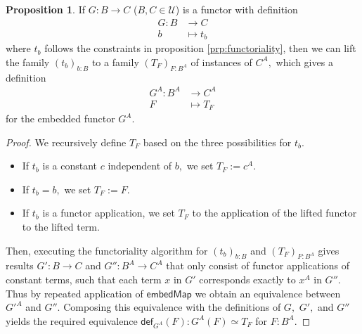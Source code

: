 \documentclass[a4paper]{article}
\theoremstyle{definition}
\newtheorem{proposition}[definition]{Proposition}
\theoremstyle{remark}
\renewcommand{\equiv}{\simeq}
\newcommand{\U}{\mathcal{U}}
\newcommand{\nm}{\mathsf}
\newcommand{\fndef}[1]{\nm{def}_{#1}}
\begin{document}
\begin{proposition}
  \label{prp:fun-univ-lift-fun}
  If $G : B \to C$ ($B,C \in \U$) is a functor with definition
  \begin{align*}
    G : B &\to     C\\
        b &\mapsto t_b
  \end{align*}
  where $t_b$ follows the constraints in proposition \ref{prp:functoriality},
  then we can lift the family $(t_b)_{b : B}$ to a family $(T_F)_{F : B^A}$ of
  instances of $C^A,$ which gives a definition
  \begin{align*}
    G^A : B^A &\to     C^A\\
          F   &\mapsto T_F
  \end{align*}
  for the embedded functor $G^A.$
\end{proposition}

\begin{proof}
  We recursively define $T_F$ based on the three possibilities for $t_b.$
  \begin{itemize}
    \item If $t_b$ is a constant $c$ independent of $b,$ we set $T_F := c^A.$
    \item If $t_b = b,$ we set $T_F := F.$
    \item If $t_b$ is a functor application, we set $T_F$ to the application of
    the lifted functor to the lifted term.
  \end{itemize}
  Then, executing the functoriality algorithm for $(t_b)_{b : B}$ and
  $(T_F)_{F : B^A}$ gives results $G' : B \to C$ and $G'' : B^A \to C^A$ that
  only consist of functor applications of constant terms, such that each term
  $x$ in $G'$ corresponds exactly to $x^A$ in $G''.$ Thus by repeated application
  of $\nm{embedMap}$ we obtain an equivalence between $G'^A$ and $G''.$ Composing
  this equivalence with the definitions of $G,$ $G',$ and $G''$ yields the
  required equivalence $\fndef{G^A}(F) : G^A(F) \equiv T_F$ for $F : B^A.$
\end{proof}
\end{document}
